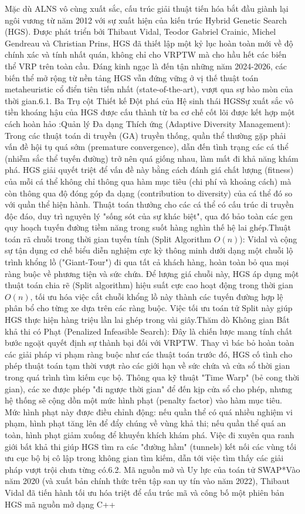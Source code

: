 \documentclass[13pt, a4paper]{extarticle} %
\begin{document}
Mặc dù ALNS vô cùng xuất sắc, cấu trúc giải thuật tiến hóa bắt đầu giành lại ngôi vương từ năm 2012 với sự xuất hiện của kiến trúc Hybrid Genetic Search (HGS). Được phát triển bởi Thibaut Vidal, Teodor Gabriel Crainic, Michel Gendreau và Christian Prins, HGS đã thiết lập một kỷ lục hoàn toàn mới về độ chính xác và tính nhất quán, không chỉ cho VRPTW mà cho hầu hết các biến thể VRP trên toàn cầu. Đáng kinh ngạc là đến tận những năm 2024-2026, các biến thể mở rộng từ nền tảng HGS vẫn đứng vững ở vị thế thuật toán metaheuristic cổ điển tiên tiến nhất (state-of-the-art), vượt qua sự bào mòn của thời gian.6.1. Ba Trụ cột Thiết kế Đột phá của Hệ sinh thái HGSSự xuất sắc vô tiền khoáng hậu của HGS được cấu thành từ ba cơ chế cốt lõi được kết hợp một cách hoàn hảo :Quản lý Đa dạng Thích ứng (Adaptive Diversity Management): Trong các thuật toán di truyền (GA) truyền thống, quần thể thường gặp phải vấn đề hội tụ quá sớm (premature convergence), dẫn đến tình trạng các cá thể (nhiễm sắc thể tuyến đường) trở nên quá giống nhau, làm mất đi khả năng khám phá. HGS giải quyết triệt để vấn đề này bằng cách đánh giá chất lượng (fitness) của mỗi cá thể không chỉ thông qua hàm mục tiêu (chi phí và khoảng cách) mà còn thông qua độ đóng góp đa dạng (contribution to diversity) của cá thể đó so với quần thể hiện hành. Thuật toán thưởng cho các cá thể có cấu trúc di truyền độc đáo, duy trì nguyên lý "sống sót của sự khác biệt", qua đó bảo toàn các gen quy hoạch tuyến đường tiềm năng trong suốt hàng nghìn thế hệ lai ghép.Thuật toán rã chuỗi trong thời gian tuyến tính (Split Algorithm $O(n)$): Vidal và cộng sự tận dụng cơ chế biểu diễn nghiệm cực kỳ thông minh dưới dạng một chuỗi lộ trình khổng lồ ("Giant-Tour") đi qua tất cả khách hàng, hoàn toàn bỏ qua mọi ràng buộc về phương tiện và sức chứa. Để lượng giá chuỗi này, HGS áp dụng một thuật toán chia rẽ (Split algorithm) hiệu suất cực cao hoạt động trong thời gian $O(n)$, tối ưu hóa việc cắt chuỗi khổng lồ này thành các tuyến đường hợp lệ phân bổ cho từng xe dựa trên các ràng buộc. Việc tối ưu toán tử Split này giúp HGS thực hiện hàng triệu lần lai ghép trong vài giây.Thăm dò Không gian Bất khả thi có Phạt (Penalized Infeasible Search): Đây là chiến lược mang tính chất bước ngoặt quyết định sự thành bại đối với VRPTW. Thay vì bác bỏ hoàn toàn các giải pháp vi phạm ràng buộc như các thuật toán trước đó, HGS cố tình cho phép thuật toán tạm thời vượt rào các giới hạn về sức chứa và cửa sổ thời gian trong quá trình tìm kiếm cục bộ. Thông qua kỹ thuật "Time Warp" (bẻ cong thời gian), các xe được phép "đi ngược thời gian" để đến kịp cửa sổ cho phép, nhưng hệ thống sẽ cộng dồn một mức hình phạt (penalty factor) vào hàm mục tiêu. Mức hình phạt này được điều chỉnh động: nếu quần thể có quá nhiều nghiệm vi phạm, hình phạt tăng lên để đẩy chúng về vùng khả thi; nếu quần thể quá an toàn, hình phạt giảm xuống để khuyến khích khám phá. Việc đi xuyên qua ranh giới bất khả thi giúp HGS tìm ra các "đường hầm" (tunnels) kết nối các vùng tối ưu cục bộ bị cô lập trong không gian tìm kiếm, dẫn tới việc tìm thấy các giải pháp vượt trội chưa từng có.6.2. Mã nguồn mở và Uy lực của toán tử SWAP*Vào năm 2020 (và xuất bản chính thức trên tập san uy tín vào năm 2022), Thibaut Vidal đã tiến hành tối ưu hóa triệt để cấu trúc mã và công bố một phiên bản HGS mã nguồn mở dạng C++ 
\end{document}
